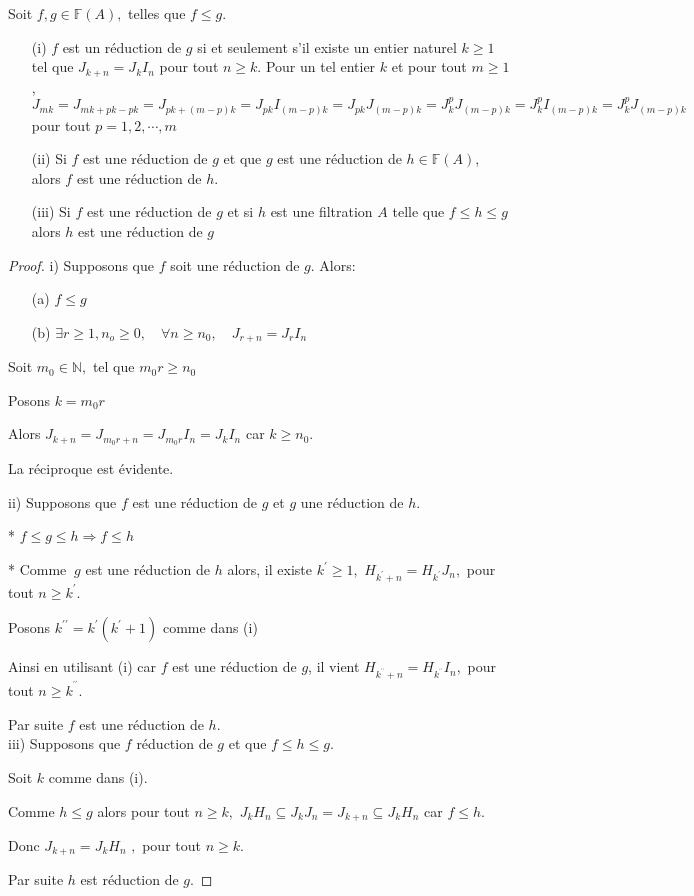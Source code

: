 \begin{maproposition}
	Soit $f,g \in \mathbb{F}(A),$ telles que $f \leqslant g$.
	\begin{enumerate}
		\item[(i)] $f$ est un réduction de $g$ si et seulement s'il existe un entier naturel $k \geqslant 1$ tel que $J_{k+n}  = J_{k}I_n$ pour tout $n \geqslant k$. Pour un tel entier $k$ et pour tout $m \geqslant 1$, $J_{mk}=J_{mk+pk-pk}=J_{pk+(m-p)k}=J_{pk}I_{(m-p)k}=J_{pk}J_{(m-p)k}=J_{k}^{p}J_{(m-p)k}=J_{k}^{p}I_{(m-p)k}=J_{k}^{p}J_{(m-p)k}
		$ pour tout $p=1,2,\cdots,m$
		\item[(ii)] Si $f$ est une réduction de $g$ et que $g$ est une réduction de $h \in \mathbb{F}(A)$, alors $f$ est une réduction de $h$. 
		\item[(iii)] Si $f$ est une réduction de $g$ et si $h$ est une filtration $A$ telle que $f \leqslant h \leqslant g$ alors $h$ est une réduction de $g$
	\end{enumerate}
\end{maproposition}
\begin{proof}
	i) Supposons que $f$ soit une réduction de $g$. Alors:
	\begin{enumerate}
		\item[(a)] $f \leqslant g$
		\item[(b)] $\exists r \geqslant 1,n_o \geqslant 0 ,\quad \forall n \geqslant n_0,\quad J_{r+n}= J_r I_n $
	\end{enumerate}
	Soit $m_{0}\in \mathbb{N},$ tel que $m_{0}r\geq n_{0}$
	
	Posons $k=m_{0}r$
	
	Alors $J_{k+n}=J_{m_{0}r+n}=J_{m_{0}r}I_{n}=J_{k}I_{n}$ car $k\geq n_{0}.$
	
	La réciproque est évidente.
	
	ii) Supposons que $f$ est une réduction de $g$ et $g$ une réduction
	de $h.$
	
	* $f\leq g\leq h\Rightarrow f\leq h$
	
	* Comme $\ g$ est une réduction de $h$ alors, il existe $k^{\prime }\geq
	1,$ $H_{k^{\prime }+n}=H_{k^{\prime }}J_{n},$ pour tout $n\geq k^{\prime }.$
	
	Posons $k^{\prime \prime }=k^{\prime }(k^{\prime }+1)$ comme dans (i)
	
	Ainsi en utilisant (i) car $f$ est une réduction de $g$, il vient  $H_{k^{^{\prime \prime }}+n}=H_{k^{^{\prime \prime }}}I_{n},$ pour tout $n\geq k^{^{\prime \prime }}.$
	
	Par suite $f$ est une réduction de $h$. \\
	
	iii) Supposons que $f$ réduction de $g$ et que $f\leq h\leq g.$
	
	Soit $k$ comme dans (i).
	
	Comme $h\leq g$ alors pour tout $n\geq k,$ $J_{k}H_{n}\subseteq
	J_{k}J_{n}=J_{k+n}\subseteq J_{k}H_{n}$ car $f\leq h.$
	
	Donc $J_{k+n}=J_{k}H_{n}$ $,$ pour tout $n\geq k.$
	
	Par suite $h$ est réduction de $g.$
\end{proof}

